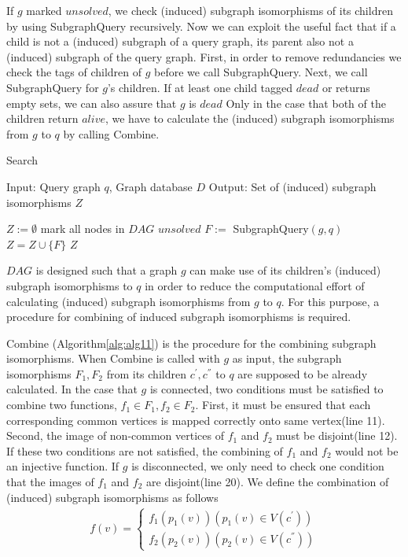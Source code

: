 If $g$ marked $unsolved$, we check (induced) subgraph isomorphisms of its children by using SubgraphQuery recursively.
Now we can exploit the useful fact that if a child is not a (induced) subgraph of a query graph, its parent also not a (induced) subgraph of the query graph.
First, in order to remove redundancies we check the tags of children of $g$ before we call SubgraphQuery. 
Next, we call SubgraphQuery for $g$'s children.
If at least one child tagged $dead$ or returns empty sets, we can also assure that $g$ is $dead$  
Only in the case that both of the children return $alive$, we have to calculate the (induced) subgraph isomorphisms from $g$ to $q$ by calling Combine.

\begin{algorithm}[t]
\caption{Search}
\label{alg:alg4}
\begin{algorithmic}
\STATE Input: Query graph $q$, Graph database $D$
\STATE Output: Set of (induced) subgraph isomorphisms $Z$
\end{algorithmic}
\begin{algorithmic}[1]
\STATE $Z := \emptyset$
\STATE mark all nodes in $DAG$ $unsolved$
	\STATE $F :=$ SubgraphQuery$(g,q)$
		\STATE $Z = Z \cup \{F\}$
	\ENDIF
\ENDFOR
\RETURN $Z$
\end{algorithmic}
\end{algorithm}



$DAG$ is designed such that a graph $g$ can make use of its children's (induced) subgraph isomorphisms to $q$ in order to reduce the computational effort of 
calculating (induced) subgraph isomorphisms from $g$ to $q$. For this purpose, a procedure for combining of induced subgraph isomorphisms is required.

Combine (Algorithm\ref{alg:alg11}) is the procedure for the combining subgraph isomorphisms. When Combine is called with $g$ as input, the subgraph 
isomorphisms $F_1, F_2$ from its children $c^{'}, c^{''}$ to $q$ are supposed to be already calculated.
In the case that $g$ is connected, two conditions must be satisfied to combine two functions, $f_1 \in F_1, f_2 \in F_2$.
First, it must be ensured that each corresponding common vertices is mapped correctly onto same vertex(line 11).
Second, the image of non-common vertices of $f_1$ and $f_2$ must be disjoint(line 12).
If these two conditions are not satisfied, the combining of $f_1$ and $f_2$ would not be an injective function.
If $g$ is disconnected, we only need to check one condition that the images of $f_1$ and $f_2$ are disjoint(line 20).
We define the combination of (induced) subgraph isomorphisms as follows
\begin{eqnarray}
\label{eq:eq1}
f(v) = \left\{
\begin{array}{l}
f_1(p_1(v)) (p_1(v) \in V(c^{'}))\\
f_2(p_2(v)) (p_2(v) \in V(c^{''}))
\end{array}
\right.
\end{eqnarray}
 

